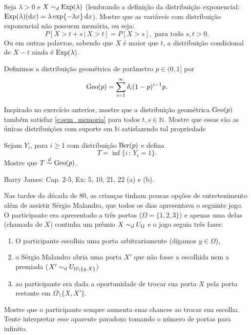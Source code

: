 \begin{exercise}
  Seja $\lambda > 0$ e $X \sim_d \operatorname{Exp}(\lambda)$ (lembrando a definição da distribuição exponencial: $\operatorname{Exp}(\lambda)(\mathop{}\!\mathrm{d} x) = \lambda \exp\{- \lambda x\} \mathop{}\!\mathrm{d} x$).
  Mostre que as variáveis com distribuição exponencial não possuem memória, ou seja:
  \begin{equation}
    \label{e:sem_memoria}
    P[X > t + s\, |\, X > t] = P [X > s], \text{ para todo $s, t > 0$}.
  \end{equation}
  Ou em outras palavras, sabendo que $X$ é maior que $t$, a distribuição condicional de $X - t$ ainda é $\operatorname{Exp}(\lambda)$.
\end{exercise}

Definimos a distribuição geométrica  de parâmetro $p \in (0,1]$ por
\begin{equation}
  \operatorname{Geo}(p) = \sum_{i = 1}^\infty \delta_i (1-p)^{i-1} p.
\end{equation}

\begin{exercise}
  Inspirado no exercício anterior, mostre que a distribuição geométrica $\operatorname{Geo}(p)$ também satisfaz \eqref{e:sem_memoria} para todos $t, s \in \mathbb{N}$.
  Mostre que essas são as únicas distribuições com suporte em $\mathbb{N}$ satisfazendo tal propriedade
\end{exercise}

\begin{exercise}
  \label{x:geo_time}
  Sejam $Y_i$, para $i \geq 1$ \iid com distribuição $\operatorname{Ber}(p)$ e defina
  \begin{equation}
    T = \inf\{i\, : \, Y_i = 1\}.
  \end{equation}
  Mostre que $T \overset{d}\sim \operatorname{Geo}(p)$.
\end{exercise}

\begin{exercise}
  Barry James: Cap. 2-5, Ex: 5, 10, 21, 22 (a) e (b).
\end{exercise}

\begin{exercise}
  Nas tardes da década de 80, as crianças tinham poucas opções de entretenimento além de assistir Sérgio Malandro, que todos os dias apresentava o seguinte jogo.
  O participante era apresentado a três portas ($\Omega = \{1,2,3\}$) e apenas uma delas (chamada de $X$) continha um prêmio $X \sim_d U_{\Omega}$ e o jogo seguia três fases:
  \begin{enumerate}[\quad a)]
  \item O participante escolhia uma porta arbitrariamente (digamos $y \in \Omega$),
  \item o Sérgio Malandro abria uma porta $X'$ que não fosse a escolhida nem a premiada ($X' \sim_d U_{\Omega \setminus \{y, X\}}$)
  \item ao participante era dada a oportunidade de trocar sua porta $X$ pela porta restante em $\Omega \setminus \{X, X'\}$.
  \end{enumerate}
  Mostre que o participante sempre aumenta suas chances ao trocar sua escolha.
  Tente interpretar esse aparente paradoxo tomando o número de portas para infinito.
\end{exercise}

